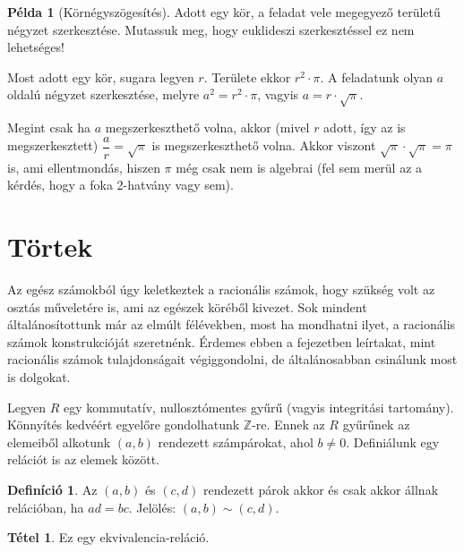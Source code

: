 \documentclass[12pt]{book}
\theoremstyle{plain} %
\theoremstyle{definition} %
\newtheorem{defi/}{Definíció}[section]
\newenvironment{defi}
  {\renewcommand{\qedsymbol}{$\clubsuit$}%
   \pushQED{\qed}\begin{defi/}}
  {\popQED\end{defi/}}
\newtheorem{pl}{Példa}[section]
\newtheorem{theo/}{Tétel}[section]
\newenvironment{theo}
  {\renewcommand{\qedsymbol}{$\clubsuit$}%
   \pushQED{\qed}\begin{theo/}}
  {\popQED\end{theo/}}
\theoremstyle{remark}
\renewcommand\qedsymbol{$\blacksquare$}
\numberwithin{equation}{section}  %
\begin{document}
	\begin{pl}[Körnégyszögesítés]
		Adott egy kör, a feladat vele megegyező területű négyzet szerkesztése. Mutassuk meg, hogy euklideszi szerkesztéssel ez nem lehetséges!
		
		Most adott egy kör, sugara legyen $r$. Területe ekkor $r^2\cdot \pi$. A feladatunk olyan $a$ oldalú négyzet szerkesztése, melyre $a^2 = r^2 \cdot \pi$, vagyis $a=r\cdot \sqrt{\pi}$.
		
		Megint csak ha $a$ megszerkeszthető volna, akkor (mivel $r$ adott, így az is megszerkesztett) $\dfrac{a}{r} = \sqrt{\pi}$ is megszerkeszthető volna. Akkor viszont $\sqrt{\pi}\cdot \sqrt{\pi} = \pi$ is, ami ellentmondás, hiszen $\pi$ még csak nem is algebrai (fel sem merül az a kérdés, hogy a foka 2-hatvány vagy sem).
	\end{pl}
	
	\section{Törtek}
	Az egész számokból úgy keletkeztek a racionális számok, hogy szükség volt az osztás műveletére is, ami az egészek köréből kivezet. Sok mindent általánosítottunk már az elmúlt félévekben, most ha mondhatni ilyet, a racionális számok konstrukcióját szeretnénk. Érdemes ebben a fejezetben leírtakat, mint racionális számok tulajdonságait végiggondolni, de általánosabban csinálunk most is dolgokat.
	
	Legyen $R$ egy kommutatív, nullosztómentes gyűrű (vagyis integritási tartomány). Könnyítés kedvéért egyelőre gondolhatunk $\mathbb{Z}$-re. Ennek az $R$ gyűrűnek az elemeiből alkotunk $(a,b)$ rendezett számpárokat, ahol $b\neq 0$. Definiálunk egy relációt is az elemek között.
	
	\begin{defi}
		Az $(a,b)$ és $(c,d)$ rendezett párok akkor és csak akkor állnak relációban, ha $ad=bc$. Jelölés: $(a,b)\sim (c,d)$.
	\end{defi}

	\begin{theo}
		Ez egy ekvivalencia-reláció.
	\end{theo}
\end{document}
